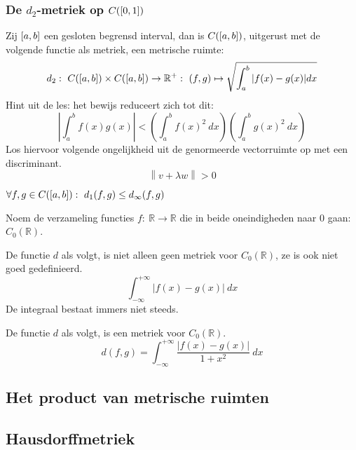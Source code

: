 \documentclass[main.tex]{subfiles}
\begin{document}
\subsubsection{De $d_2$-metriek op $C(\interval{0}{1})$}
\label{sec:de-d_2-metriek}

\begin{vb}
  Zij $\interval{a}{b}$ een gesloten begrensd interval, dan is $C(\interval{a}{b})$, uitgerust met de volgende functie als metriek, een metrische ruimte:
  \[ d_{2}:\ C(\interval{a}{b})\times C(\interval{a}{b}) \rightarrow \mathbb{R}^{+}:\ (f,g) \mapsto \sqrt{\int_{a}^{b}|f(x)-g(x)|dx} \]
  Hint uit de les: het bewijs reduceert zich tot dit:
  \[ \left|\int_{a}^{b}f(x)g(x)\right| < \left(\int_{a}^{b}f(x)^{2}\ dx \right) \left(\int_{a}^{b}g(x)^{2}\ dx \right) \]
  Los hiervoor volgende ongelijkheid uit de genormeerde vectorruimte op met een discriminant.
  \[ \left\| v+\lambda w \right\| > 0 \]
\end{vb}

\begin{st}
  $\forall f,g \in C(\interval{a}{b}):\ d_{1}(f,g) \le d_{\infty}(f,g)$
\end{st}

\begin{de}
  Noem de verzameling functies $f:\ \mathbb{R} \rightarrow \mathbb{R}$ die in beide oneindigheden naar $0$ gaan: $C_{0}(\mathbb{R})$.
\end{de}

\begin{vb}
  De functie $d$ als volgt, is niet alleen geen metriek voor $C_{0}(\mathbb{R})$, ze is ook niet goed gedefinieerd.
  \[ \int_{-\infty}^{+\infty}|f(x)-g(x)|\ dx \]
  De integraal bestaat immers niet steeds.
\end{vb}

\begin{vb}
  De functie $d$ als volgt, is een metriek voor $C_{0}(\mathbb{R})$.
  \[ d(f,g) = \int_{-\infty}^{+\infty}\frac{|f(x)-g(x)|}{1+x^{2}}\ dx \]
\end{vb}


\subsection{Het product van metrische ruimten}
\label{sec:het-product-van}


\subsection{Hausdorffmetriek}
\label{sec:hausdorffmetriek}
\end{document}

